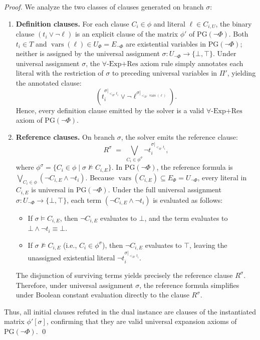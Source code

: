 \documentclass[runningheads]{llncs}
\DeclareMathOperator{\vars}{vars}
\newcommand{\Bool}{\{\bot,\top\}}
\newcommand{\ExpRes}{\forall\text{-}\mathrm{Exp}\text{+}\mathrm{Res}}
\newcommand{\PG}{\mathrm{PG}}
\begin{document}
\begin{proof}
    We analyze the two classes of clauses generated on branch $\sigma$:
    \begin{enumerate}
        \item \textbf{Definition clauses.}
              For each clause $C_i \in \phi$ and literal $\ell \in C_{i,U}$, the binary clause $(t_i \lor \neg\ell)$ is an explicit clause of the matrix $\phi'$ of $\PG(\neg\Phi)$.
              Both $t_i \in T$ and $\vars(\ell) \in U_\Phi = E_{\neg\Phi}$ are existential variables in $\PG(\neg\Phi)$; neither is assigned by the universal assignment $\sigma : U_{\neg\Phi} \to \Bool$.
              Under universal assignment $\sigma$, the $\ExpRes$ axiom rule simply annotates each literal with the restriction of $\sigma$ to preceding universal variables in $\Pi'$, yielding the annotated clause:
              \begin{equation}
                  (t_i^{\sigma|_{<_{\Pi'} t_i}} \lor \neg\ell^{\sigma|_{<_{\Pi'} \vars(\ell)}}) .
              \end{equation}
              Hence, every definition clause emitted by the solver is a valid $\ExpRes$ axiom of $\PG(\neg\Phi)$.

        \item \textbf{Reference clauses.}
              On branch $\sigma$, the solver emits the reference clause:
              \begin{equation}
                  R^\sigma \;=\; \bigvee_{C_i \in \phi^\sigma} \neg t_i^{\sigma|_{<_{\Pi'} t_i}} ,
              \end{equation}
              where $\phi^\sigma = \{C_i \in \phi \mid \sigma \not\models C_{i,E}\}$.
              In $\PG(\neg\Phi)$, the reference formula is $\bigvee_{C_i \in \phi} (\neg C_{i,E} \land \neg t_i)$.
              Because $\vars(C_{i,E}) \subseteq E_\Phi = U_{\neg\Phi}$, every literal in $C_{i,E}$ is universal in $\PG(\neg\Phi)$.
              Under the full universal assignment $\sigma : U_{\neg\Phi} \to \Bool$, each term $(\neg C_{i,E} \land \neg t_i)$ is evaluated as follows:
              \begin{itemize}
                  \item If $\sigma \models C_{i,E}$, then $\neg C_{i,E}$ evaluates to $\bot$, and the term evaluates to $\bot \land \neg t_i \equiv \bot$.
                  \item If $\sigma \not\models C_{i,E}$ (i.e., $C_i \in \phi^\sigma$), then $\neg C_{i,E}$ evaluates to $\top$, leaving the unassigned existential literal $\neg t_i^{\sigma|_{<_{\Pi'} t_i}}$.
              \end{itemize}
              The disjunction of surviving terms yields precisely the reference clause $R^\sigma$.
              Therefore, under universal assignment $\sigma$, the reference formula simplifies under Boolean constant evaluation directly to the clause $R^\sigma$.
    \end{enumerate}
    Thus, all initial clauses refuted in the dual instance are clauses of the instantiated matrix $\phi'[\sigma]$, confirming that they are valid universal expansion axioms of $\PG(\neg\Phi)$.
    \qed
\end{proof}
\end{document}
